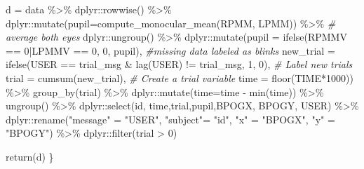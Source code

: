 \documentclass[
]{article}
\newenvironment{Shaded}{\begin{snugshade}}{\end{snugshade}}
\newcommand{\AttributeTok}[1]{\textcolor[rgb]{0.77,0.63,0.00}{#1}}
\newcommand{\CommentTok}[1]{\textcolor[rgb]{0.56,0.35,0.01}{\textit{#1}}}
\newcommand{\DecValTok}[1]{\textcolor[rgb]{0.00,0.00,0.81}{#1}}
\newcommand{\FunctionTok}[1]{\textcolor[rgb]{0.00,0.00,0.00}{#1}}
\newcommand{\NormalTok}[1]{#1}
\newcommand{\OtherTok}[1]{\textcolor[rgb]{0.56,0.35,0.01}{#1}}
\newcommand{\SpecialCharTok}[1]{\textcolor[rgb]{0.00,0.00,0.00}{#1}}
\newcommand{\StringTok}[1]{\textcolor[rgb]{0.31,0.60,0.02}{#1}}
\begin{document}
\begin{Shaded}
\begin{Highlighting}[]
  
\NormalTok{  d }\OtherTok{=}\NormalTok{ data }\SpecialCharTok{\%\textgreater{}\%}
\NormalTok{    dplyr}\SpecialCharTok{::}\FunctionTok{rowwise}\NormalTok{() }\SpecialCharTok{\%\textgreater{}\%}
\NormalTok{    dplyr}\SpecialCharTok{::}\FunctionTok{mutate}\NormalTok{(}\AttributeTok{pupil=}\FunctionTok{compute\_monocular\_mean}\NormalTok{(RPMM, LPMM)) }\SpecialCharTok{\%\textgreater{}\%} \CommentTok{\# average both eyes}
\NormalTok{             dplyr}\SpecialCharTok{::}\FunctionTok{ungroup}\NormalTok{() }\SpecialCharTok{\%\textgreater{}\%}
\NormalTok{           dplyr}\SpecialCharTok{::}\FunctionTok{mutate}\NormalTok{(}\AttributeTok{pupil =} \FunctionTok{ifelse}\NormalTok{(RPMMV }\SpecialCharTok{==} \DecValTok{0}\SpecialCharTok{|}\NormalTok{LPMMV }\SpecialCharTok{==} \DecValTok{0}\NormalTok{, }\DecValTok{0}\NormalTok{, pupil),  }\CommentTok{\#missing data labeled as blinks}
         \AttributeTok{new\_trial =} \FunctionTok{ifelse}\NormalTok{(USER }\SpecialCharTok{==}\NormalTok{ trial\_msg }\SpecialCharTok{\&} \FunctionTok{lag}\NormalTok{(USER) }\SpecialCharTok{!=}\NormalTok{ trial\_msg, }\DecValTok{1}\NormalTok{, }\DecValTok{0}\NormalTok{), }\CommentTok{\# Label new trials}
         \AttributeTok{trial =} \FunctionTok{cumsum}\NormalTok{(new\_trial), }\CommentTok{\# Create a trial variable}
         \AttributeTok{time =} \FunctionTok{floor}\NormalTok{(TIME}\SpecialCharTok{*}\DecValTok{1000}\NormalTok{)) }\SpecialCharTok{\%\textgreater{}\%}
    \FunctionTok{group\_by}\NormalTok{(trial) }\SpecialCharTok{\%\textgreater{}\%}
\NormalTok{    dplyr}\SpecialCharTok{::}\FunctionTok{mutate}\NormalTok{(}\AttributeTok{time=}\NormalTok{time }\SpecialCharTok{{-}} \FunctionTok{min}\NormalTok{(time)) }\SpecialCharTok{\%\textgreater{}\%}
    \FunctionTok{ungroup}\NormalTok{() }\SpecialCharTok{\%\textgreater{}\%}
\NormalTok{  dplyr}\SpecialCharTok{::}\FunctionTok{select}\NormalTok{(id, time,trial,pupil,BPOGX, BPOGY, USER) }\SpecialCharTok{\%\textgreater{}\%}
\NormalTok{    dplyr}\SpecialCharTok{::}\FunctionTok{rename}\NormalTok{(}\StringTok{"message"} \OtherTok{=} \StringTok{"USER"}\NormalTok{, }\StringTok{"subject"}\OtherTok{=} \StringTok{"id"}\NormalTok{, }\StringTok{"x"} \OtherTok{=} \StringTok{"BPOGX"}\NormalTok{, }\StringTok{"y"} \OtherTok{=} \StringTok{"BPOGY"}\NormalTok{) }\SpecialCharTok{\%\textgreater{}\%} 
\NormalTok{    dplyr}\SpecialCharTok{::}\FunctionTok{filter}\NormalTok{(trial }\SpecialCharTok{\textgreater{}} \DecValTok{0}\NormalTok{)}
  
  \FunctionTok{return}\NormalTok{(d)}
\NormalTok{\}}
\end{Highlighting}
\end{Shaded}
\end{document}
